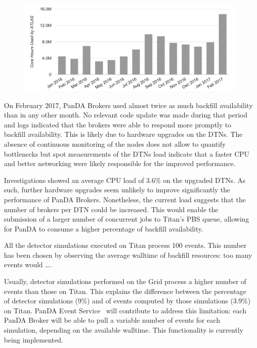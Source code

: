 \begin{figure}[htp]
    \includegraphics[clip,width=\columnwidth]{figures/cpu_hours.png}
\caption{}
\label{fig:hpc-workload-utilization}
\end{figure}

On February 2017, PanDA Brokers used almost twice as much backfill availability
than in any other month. No relevant code update was made during that period and
logs indicated that the brokers were able to respond more promptly to backfill
availability. This is likely due to hardware upgrades on the DTNs. The absence
of continuous monitoring of the nodes does not allow to quantify bottlenecks but
spot measurements of the DTNs load indicate that a faster CPU and better
networking were likely responsible for the improved performance.

Investigations showed an average CPU load of 3.6\% on the upgraded DTNs. As
such, further hardware upgrades seem unlikely to improve significantly the
performance of PanDA Brokers. Nonetheless, the current load suggests that the
number of brokers per DTN could be increased. This would enable the submission
of a larger number of concurrent jobs to Titan's PBS queue, allowing for PanDA
to consume a higher percentage of backfill availability.


All the detector simulations executed on Titan process 100 events. This number
has been chosen by observing the average walltime of backfill resources: too
many events would \ldots{}.

Usually, detector simulations performed on the Grid process a higher number of
events than those on Titan. This explains the difference between the percentage
of detector simulations (9\%) and of events computed by those simulations
(3.9\%) on Titan. PanDA Event Service~\cite{panda-event-service} will contribute
to address this limitation: each PanDA Broker will be able to pull a variable
number of events for each simulation, depending on the available walltime. This
functionality is currently being implemented.

